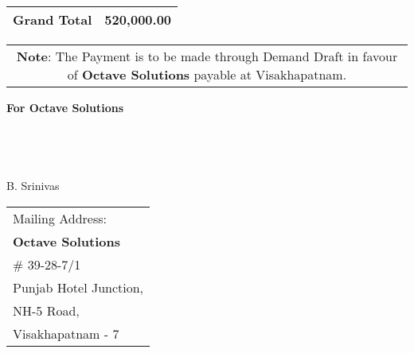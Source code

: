 \documentclass[11pt]{article}
\begin{document}
\vspace*{0.5cm}

\hspace*{12.4cm}
\begin{tabular}{|c|r|}
\hline
{\bf Grand Total} & 520,000.00 \\
\hline
\end{tabular}

\vspace*{-0.4cm}
\begin{tabular}{c}
\parbox{4in}{ {\bf Note}: The Payment is to be made through Demand Draft in favour of {\bf Octave Solutions} payable at Visakhapatnam. }\\
\end{tabular}
\vspace*{55pt}


{\bf For  Octave Solutions } \\ \\ \\ \\ \\
 \hspace*{0.6cm}B. Srinivas
\vspace*{-71pt}
\begin{flushright}
\begin{tabular}{l}
Mailing Address:\\
{\bf Octave Solutions}\\
\# 39-28-7/1\\
Punjab Hotel Junction, \\ 
NH-5 Road, \\
Visakhapatnam - 7\\
\end{tabular}
\end{flushright}
\end{document}
